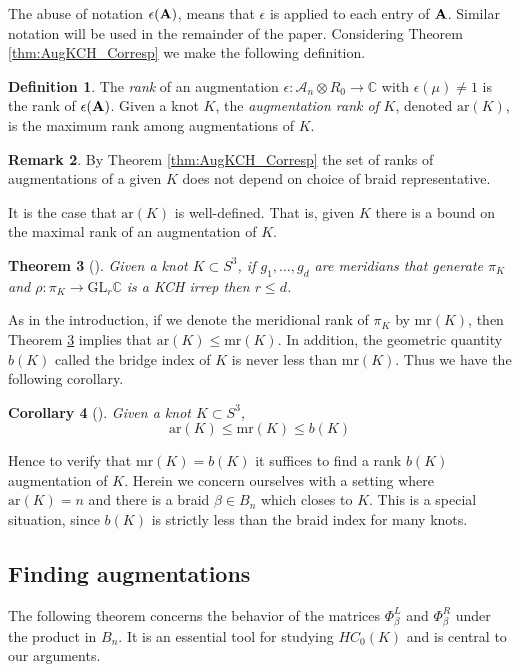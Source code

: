 \documentclass[11pt]{amsart}
\def\C{{\mathbb C}}
\def\A{{\mathcal A}}
\newtheorem{thm}{Theorem}[section]
\newtheorem{cor}[thm]{Corollary}
\theoremstyle{definition}
\newtheorem{defn}[thm]{Definition}
\newtheorem{rem}[thm]{Remark}
\begin{document}
  The abuse of notation $\epsilon({\bf A})$, means that $\epsilon$ is applied to each entry of ${\bf A}$. Similar notation will be used in the remainder of the paper. Considering Theorem \ref{thm:AugKCH_Corresp} we make the following definition.

  \begin{defn}
  The \emph{rank} of an augmentation $\epsilon:\A_n\otimes R_0\to\C$ with $\epsilon(\mu)\ne 1$ is the rank of $\epsilon({\bf A})$. Given a knot $K$, the \emph{augmentation rank of} $K$, denoted $\text{ar}(K)$, is the maximum rank among augmentations of $K$.
  \label{defn:AugRk}
  \end{defn}

  \begin{rem} By Theorem \ref{thm:AugKCH_Corresp} the set of ranks of augmentations of a given $K$ does not depend on choice of braid representative.
  \end{rem}

  It is the case that $\text{ar}(K)$ is well-defined. That is, given $K$ there is a bound on the maximal rank of an augmentation of $K$.

  \begin{thm}[\cite{Cor13b}] Given a knot $K\subset S^3$, if $g_1,\ldots,g_d$ are meridians that generate $\pi_K$ and $\rho:\pi_K\to\text{GL}_r\C$ is a KCH irrep then $r\le d$.
  \label{thm:DimBound}
  \end{thm}

  As in the introduction, if we denote the meridional rank of $\pi_K$ by $\text{mr}(K)$, then Theorem \ref{thm:DimBound} implies that $\text{ar}(K)\le\text{mr}(K)$. In addition, the geometric quantity $b(K)$ called the bridge index of $K$ is never less than $\text{mr}(K)$. Thus we have the following corollary.
    
\begin{cor}[\cite{Cor13b}] Given a knot $K\subset S^3$,
$$\text{ar}(K)\le\text{mr}(K)\le b(K)$$
\label{cor:DimBound}
\end{cor}

  Hence to verify that $\text{mr}(K)=b(K)$ it suffices to find a rank $b(K)$ augmentation of $K$. Herein we concern ourselves with a setting where $\text{ar}(K)=n$ and there is a braid $\beta\in B_n$ which closes to $K$. This is a special situation, since $b(K)$ is strictly less than the braid index for many knots.

\subsection{Finding augmentations}
\label{SecBG_AugExist}
  The following theorem concerns the behavior of the matrices $\Phi_\beta^L$ and $\Phi_\beta^R$ under the product in $B_n$. It is an essential tool for studying $HC_0(K)$ and is central to our arguments.
\end{document}
